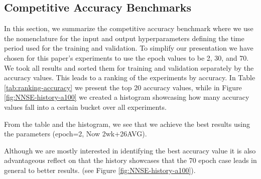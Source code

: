 \documentclass[utf8]{FrontiersinVancouver} %
\begin{document}
{\subsection{Competitive Accuracy Benchmarks}

In this section, we summarize the competitive accuracy benchmark where
we use the nomenclature for the input and output hyperparameters
defining the time period used for the training and validation.  To
simplify our presentation we have chosen for this paper's experiments
to use the epoch values to be 2, 30, and 70. We took all results and
sorted them for training and validation separately by the accuracy
values. This leads to a ranking of the experiments by accuracy. In
Table \ref{tab:ranking-accuracy} we present the top 20 accuracy
values, while in Figure \ref{fig:NNSE-history-a100} we created a
histogram showcasing how many accuracy values fall into a certain
bucket over all experiments.

From the table and the histogram, we see that we achieve the best
results using the parameters (epoch=2, Now 2wk+26AVG).

Although we are mostly interested in identifying the best accuracy
value it is also advantageous reflect on that the history showcases
that the 70 epoch case leads in general to better results.  (see
Figure \ref{fig:NNSE-history-a100}).


}
\end{document}
